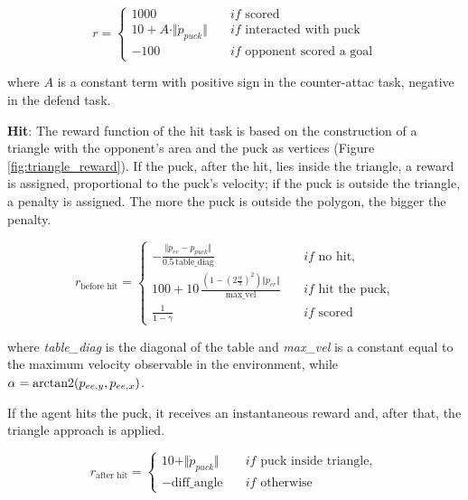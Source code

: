 \begin{equation*}
    r = \left\{
        \begin{aligned}
            1000 \quad &if \text{ scored} \\
            10 + A \cdot \Vert \dot{p}_{puck} \Vert \quad &if \text{ interacted with puck} \\
            -100 \quad &if \text{ opponent scored a goal}
        \end{aligned}
    \right.
\end{equation*}

where $A$ is a constant term with positive sign in the counter-attac task, negative in the defend task.

\textbf{Hit}:
The reward function of the hit task is based on the construction of a triangle with the opponent's area and the puck as vertices (Figure \ref{fig:triangle_reward}).
If the puck, after the hit, lies inside the triangle, a reward is assigned, proportional to the puck's velocity; if the puck is outside the triangle, a penalty is assigned.
The more the puck is outside the polygon, the bigger the penalty.

\begin{equation*}
    r_{\text{before hit}} = \left\{
        \begin{aligned}
            -\frac{\Vert p_{ee} - p_{puck} \Vert}{0.5 \, \text{table\_diag}} \quad &if \text{ no hit,} \\
            100 + 10\,\frac{\left(1 - \left(2\frac{\alpha}{\pi}\right)^2\right)\Vert \dot{p}_{ee} \Vert}{\text{max\_vel}} \quad &if \text{ hit the puck,} \\
            \frac{1}{1 - \gamma} \quad &if \text{ scored}
        \end{aligned}
    \right.
\end{equation*}

where \textit{table\_diag} is the diagonal of the table and \textit{max\_vel} is a constant equal to the maximum velocity observable in the environment,
while $\alpha = \operatorname{arctan2}(p_{ee,y}, p_{ee,x})$.

If the agent hits the puck, it receives an instantaneous reward and, after that, the triangle approach is applied.

\begin{equation*}
    r_{\text{after hit}} = \left\{
        \begin{aligned}
            10 + \Vert \dot{p}_{puck} \Vert \quad  &if \text{ puck inside triangle}, \\
            -\text{diff\_angle} \quad              &if \text{ otherwise} 
        \end{aligned}
    \right.
    \end{equation*}


